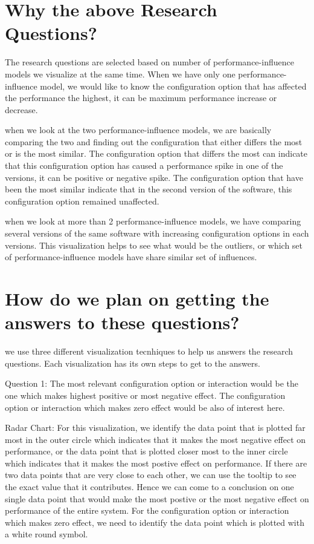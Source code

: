 \section{Why the above Research Questions?}
The research questions are selected based on number of performance-influence models we visualize at the same time. When we have only one performance-influence model, we would like to know the configuration option that has affected the performance the highest, it can be maximum performance increase or decrease. 

when we look at the two performance-influence models, we are basically comparing the two and finding out the configuration that either differs the most or is the most similar. The configuration option that differs the most can indicate that this configuration option has caused a performance spike in one of the versions, it can be positive or negative spike. The configuration option that have been the most similar indicate that in the second version of the software, this configuration option remained unaffected.

when we look at more than 2 performance-influence models, we have comparing several versions of the same software with increasing configuration options in each versions. This visualization helps to see what would be the outliers, or which set of performance-influence models have share similar set of influences.

\section{How do we plan on getting the answers to these questions?}

we use three different visualization tecnhiques to help us answers the research questions. Each visualization has its own steps to get to the answers.

Question 1: The  most relevant configuration option or interaction would be the one which makes highest positive or most negative effect. The configuration option or interaction which makes zero effect would be also of interest here.

 Radar Chart:  For this visualization, we identify the data point that is plotted far most in the outer circle which indicates that it makes the most negative effect on performance, or the data point that is plotted closer most to the inner circle which indicates that it makes the most postive effect on performance. If there are two data points that are very close to each other, we can use the tooltip to see the exact value that it contributes. Hence we can come to a conclusion on one single data point that would make the most postive or the most negative effect on performance of the entire system. For the configuration option or interaction which makes zero effect, we need to identify the data point which is plotted with a white round symbol.

